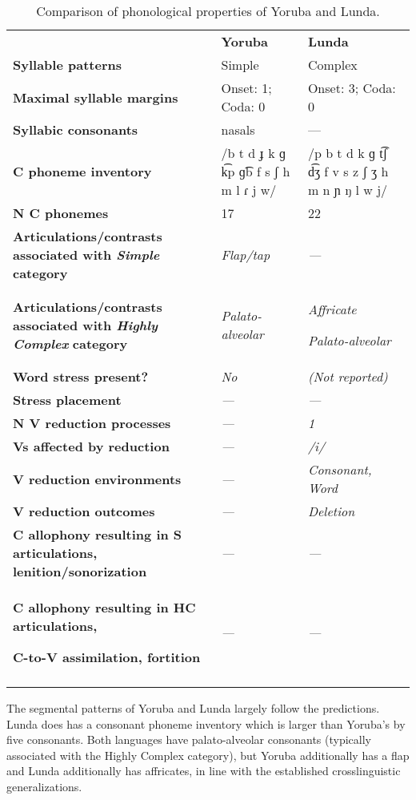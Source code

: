 \begin{table}
\begin{tabularx}{\textwidth}{XXX}
\lsptoprule
 & \textbf{Yoruba} & \textbf{Lunda}\\
 \textbf{Syllable patterns} & Simple & Complex\\
 \textbf{Maximal syllable margins} & Onset: 1; Coda: 0 & Onset: 3; Coda: 0\\
 \textbf{Syllabic consonants} & nasals & —\\
 \textbf{C phoneme inventory} & /b t d ɟ k ɡ k͡p ɡ͡b f s ʃ h m l ɾ j w/ & /p b t d k ɡ t͡ʃ d͡ʒ f v s z ʃ ʒ h m n ɲ ŋ l w j/\\
 \textbf{N C phonemes} & 17 & 22\\
 \textbf{Articulations/contrasts associated with \textit{Simple}} \textbf{category} & \textit{Flap/tap} & \textit{—}\\
 \textbf{Articulations/contrasts associated with \textit{Highly Complex}} \textbf{category} & \textit{Palato-alveolar} & { \textit{Affricate}}

 \textit{Palato-alveolar}\\
 \textbf{Word stress present?} & \textit{No} & \textit{(Not reported)}\\
 \textbf{Stress placement} & \textit{—} & \textit{—}\\
 \textbf{N V reduction processes} & \textit{—} & \textit{1}\\
 \textbf{Vs affected by reduction}  & \textit{—} & \textit{/i/}\\
 \textbf{V reduction environments} & \textit{—} & \textit{Consonant, Word}\\
 \textbf{V reduction outcomes} & \textit{—} & \textit{Deletion}\\
 \textbf{C allophony resulting in S articulations, lenition/sonorization} & \textit{—} & \textit{—}\\
{ \textbf{C allophony resulting in HC articulations,} }

 \textbf{C-to-V assimilation, fortition} & \textit{—} & \textit{—}\\
\lspbottomrule
\end{tabularx}
\caption{\label{tab:8.4}Comparison of phonological properties of Yoruba and Lunda.}
\end{table}

  The segmental patterns of Yoruba and Lunda largely follow the predictions. Lunda does has a consonant phoneme inventory which is larger than Yoruba’s by five consonants. Both languages have palato-alveolar consonants (typically associated with the Highly Complex category), but Yoruba additionally has a flap and Lunda additionally has affricates, in line with the established crosslinguistic generalizations.

